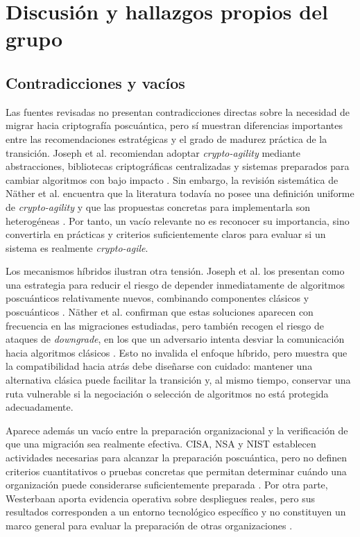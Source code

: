 \section{Discusión y hallazgos propios del grupo}
\label{sec:discusion}

\subsection{Contradicciones y vacíos}

Las fuentes revisadas no presentan contradicciones directas sobre la necesidad de migrar hacia criptografía poscuántica, pero sí muestran diferencias importantes entre las recomendaciones estratégicas y el grado de madurez práctica de la transición. Joseph et al. recomiendan adoptar \textit{crypto-agility} mediante abstracciones, bibliotecas criptográficas centralizadas y sistemas preparados para cambiar algoritmos con bajo impacto \cite{joseph2022transitioning}. Sin embargo, la revisión sistemática de Näther et al. encuentra que la literatura todavía no posee una definición uniforme de \textit{crypto-agility} y que las propuestas concretas para implementarla son heterogéneas \cite{naether2024migrating}. Por tanto, un vacío relevante no es reconocer su importancia, sino convertirla en prácticas y criterios suficientemente claros para evaluar si un sistema es realmente \textit{crypto-agile}.

Los mecanismos híbridos ilustran otra tensión. Joseph et al. los presentan como una estrategia para reducir el riesgo de depender inmediatamente de algoritmos poscuánticos relativamente nuevos, combinando componentes clásicos y poscuánticos \cite{joseph2022transitioning}. Näther et al. confirman que estas soluciones aparecen con frecuencia en las migraciones estudiadas, pero también recogen el riesgo de ataques de \textit{downgrade}, en los que un adversario intenta desviar la comunicación hacia algoritmos clásicos \cite{naether2024migrating}. Esto no invalida el enfoque híbrido, pero muestra que la compatibilidad hacia atrás debe diseñarse con cuidado: mantener una alternativa clásica puede facilitar la transición y, al mismo tiempo, conservar una ruta vulnerable si la negociación o selección de algoritmos no está protegida adecuadamente.

Aparece además un vacío entre la preparación organizacional y la verificación de que una migración sea realmente efectiva.
CISA, NSA y NIST establecen actividades necesarias para alcanzar la preparación poscuántica, pero no definen criterios cuantitativos o pruebas concretas que
permitan determinar cuándo una organización puede considerarse suficientemente preparada \cite{cisa2023quantum}. Por otra parte, Westerbaan aporta evidencia operativa sobre despliegues reales, pero sus resultados corresponden a un entorno tecnológico específico y no constituyen un marco general para evaluar
la preparación de otras organizaciones \cite{westerbaan2025postquantum}.


